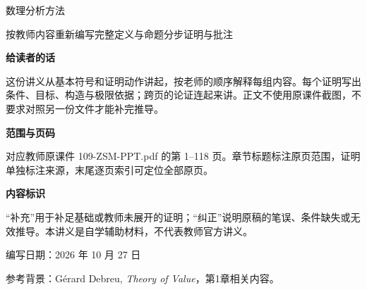 
\newcommand{\LectureID}{109}

\begin{titlepage}
\vspace*{1.4cm}
{\Huge\sffamily 数理分析方法\par}
\vspace{.8cm}{\LARGE\sffamily 向量、凸性与无穷远方向\par}
\vspace{.5cm}{\Large Lecture 109 · 证明考试自学讲义\par}
\vspace{1cm}
按教师内容重新编写\quad 完整定义与命题\quad 分步证明与批注\par
\vspace{.7cm}
\textbf{给读者的话}\par
这份讲义从基本符号和证明动作讲起，按老师的顺序解释每组内容。每个证明写出条件、目标、构造与极限依据；跨页的论证连起来讲。正文不使用原课件截图，不要求对照另一份文件才能补完推导。\par
\textbf{范围与页码}\par
对应教师原课件 109-ZSM-PPT.pdf 的第 1--118 页。章节标题标注原页范围，证明单独标注来源，末尾逐页索引可定位全部原页。\par
\textbf{内容标识}\par
“补充”用于补足基础或教师未展开的证明；“纠正”说明原稿的笔误、条件缺失或无效推导。本讲义是自学辅助材料，不代表教师官方讲义。\par
\vfill
编写日期：2026 年 10 月 27 日\par
参考背景：Gérard Debreu, \emph{Theory of Value}，第1章相关内容。
\end{titlepage}
\tableofcontents\clearpage



